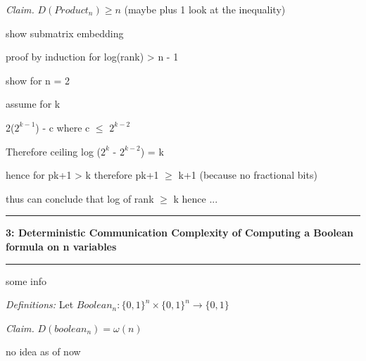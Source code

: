 \documentclass[11pt]{article}
\newcommand\question[2]{\vspace{.25in}\hrule\textbf{#1: #2}\vspace{.5em}\hrule\vspace{.10in}}
\newcommand\definitions{\emph{Definitions:}\newline}
\newcommand\claim{\emph{Claim.}\newline}
\begin{document}
\claim
$D(Product_n) \geq n$ (maybe plus 1 look at the inequality)

\proof 
show submatrix embedding

proof by induction for log(rank) > n - 1

show for n = 2 

assume for k

2($2^{k-1}$) - c where c $\leq$ $2^{k-2}$

Therefore ceiling log ($2^k$ - $2^{k-2}$) = k

hence for pk+1 > k therefore pk+1 $\geq$ k+1 (because no fractional bits)

thus can conclude that log of rank $\geq$ k hence ...

\newpage

\question{3}{Deterministic Communication Complexity of Computing a Boolean formula on n variables} 

some info

\definitions
Let $Boolean_n: {\{0, 1\}}^n \times {\{0, 1\}}^n \to \{0, 1\}$

\claim
$D(boolean_n) = \omega(n)$ 

\proof 

no idea as of now 

\newpage
\end{document}
